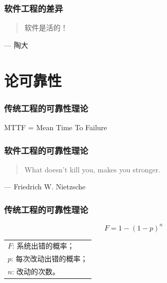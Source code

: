 \documentclass[UTF8,lualatex]{ctexbeamer}
\newcommand{\pagequote}[2]{
  \Large
  \begin{quotation}
      #1
  \end{quotation}
  \flushright\normalsize --- {#2}
}
\begin{document}
\begin{frame}
    \frametitle{软件工程的差异}
    \pagequote{\noindent\center 软件是活的！}{陶大}
\end{frame}

\section{论可靠性}

\begin{frame}
    \frametitle{传统工程的可靠性理论}
    \begin{center}
        \large
        MTTF = Mean Time To Failure
    \end{center}
\end{frame}


\begin{frame}
    \frametitle{软件工程的可靠性理论}
    \pagequote{What doesn't kill you, makes you stronger.}{Friedrich W. Nietzsche}
\end{frame}


\begin{frame}
    \frametitle{传统工程的可靠性理论}
    \[
    F=1-(1-p)^n
    \]
    \begin{center}
        \begin{tabu}{l}
            $F$: 系统出错的概率；\\
            $p$: 每次改动出错的概率；\\
            $n$: 改动的次数。
        \end{tabu}
    \end{center}
\end{frame}
\end{document}

